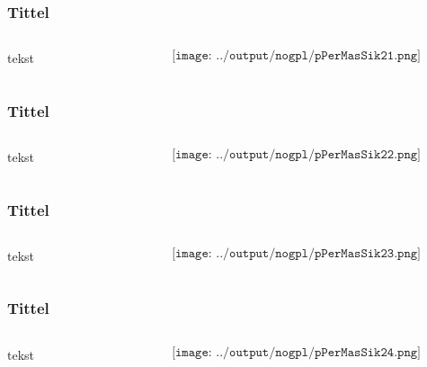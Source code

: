 \documentclass[aspectratio=169,xcolor=dvipsnames]{beamer}
\begin{document}
\begin{frame}
	\frametitle{Tittel}
	\begin{columns}
		\begin{column}{0.5\textwidth}
tekst
			
		\end{column}

		\begin{column}{0.5\textwidth}
	$$\texttt{[image: ../output/nogpl/pPerMasSik21.png]}$$
		\end{column}
	\end{columns}
\end{frame}

\begin{frame}
	\frametitle{Tittel}
	\begin{columns}
		\begin{column}{0.5\textwidth}
tekst
			
		\end{column}

		\begin{column}{0.5\textwidth}
	$$\texttt{[image: ../output/nogpl/pPerMasSik22.png]}$$
		\end{column}
	\end{columns}
\end{frame}

\begin{frame}
	\frametitle{Tittel}
	\begin{columns}
		\begin{column}{0.5\textwidth}
tekst
			
		\end{column}

		\begin{column}{0.5\textwidth}
	$$\texttt{[image: ../output/nogpl/pPerMasSik23.png]}$$
		\end{column}
	\end{columns}
\end{frame}

\begin{frame}
	\frametitle{Tittel}
	\begin{columns}
		\begin{column}{0.5\textwidth}
tekst
			
		\end{column}

		\begin{column}{0.5\textwidth}
	$$\texttt{[image: ../output/nogpl/pPerMasSik24.png]}$$
		\end{column}
	\end{columns}
\end{frame}
\end{document}
